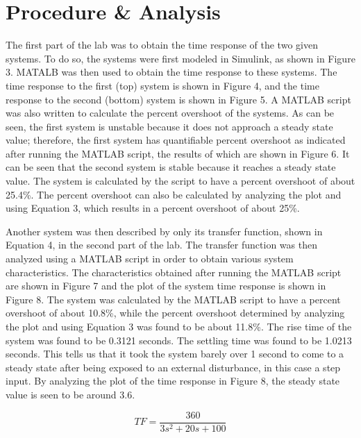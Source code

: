 \documentclass[12pt]{article}
\begin{document}
\section*{\fontsize{12}{12}\selectfont \large Procedure \& Analysis}
The first part of the lab was to obtain the time response of the two given systems. To do so, the systems were first modeled in Simulink, as shown in Figure 3. MATALB was then used to obtain the time response to these systems. The time response to the first (top) system is shown in Figure 4, and the time response to the second (bottom) system is shown in Figure 5. A MATLAB script was also written to calculate the percent overshoot of the systems. As can be seen, the first system is unstable because it does not approach a steady state value; therefore, the first system has quantifiable percent overshoot as indicated after running the MATLAB script, the results of which are shown in Figure 6. It can be seen that the second system is stable because it reaches  a steady state value. The system is calculated by the script to have a percent overshoot of about 25.4\%. The percent overshoot can also be calculated by analyzing the plot and using Equation 3, which results in a percent overshoot of about 25\%.
\bigskip

Another system was then described by only its transfer function, shown in Equation 4, in the second part of the lab. The transfer function was then analyzed using a MATLAB script in order to obtain various system characteristics. The characteristics obtained after running the MATLAB script are shown in Figure 7 and the plot of the system time response is shown in Figure 8. The system was calculated by the MATLAB script to have a percent overshoot of about 10.8\%, while the percent overshoot determined by analyzing the plot  and using Equation 3 was found to be about 11.8\%. The rise time of the system was found to be 0.3121 seconds. The settling time was found to be 1.0213 seconds. This tells us that it took the system barely over 1 second to come to a steady state after being exposed to an external disturbance, in this case a step input. By analyzing the plot of the time response in Figure 8, the steady state value is seen to be around 3.6.
\bigskip
\bigskip

\begin{equation}
TF = \frac{360}{3s^2+20s+100}
\end{equation}

\newpage

\bigskip
\bigskip
\end{document}

